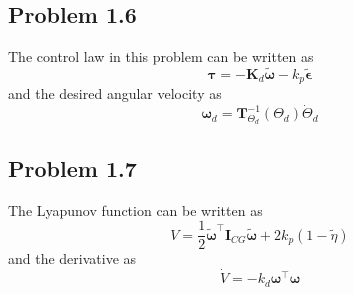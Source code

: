 \subsection*{Problem 1.6}
The control law in this problem can be written as
\begin{equation}
	\boldsymbol{\tau} = -\mathbf{K}_d \tilde{\boldsymbol{\omega}} - k_p \tilde{\boldsymbol{\epsilon}}
\end{equation}
and the desired angular velocity as
\begin{equation}
	\boldsymbol{\omega}_d = \mathbf{T}^{-1}_{\Theta_d}(\Theta_d)\dot{\Theta}_d
\end{equation}

\subsection*{Problem 1.7}
The Lyapunov function can be written as 
 \begin{equation}
	 V = \frac{1}{2} \tilde{\boldsymbol{\omega}}^{\top} \mathbf{I}_{CG}\tilde{\boldsymbol{\omega}} + 2 k_p (1-\tilde{\eta})
 \end{equation}
and the derivative as 
\begin{equation}
	\dot{V} = -k_d \boldsymbol{\omega}^{\top} \boldsymbol{\omega}
\end{equation}

